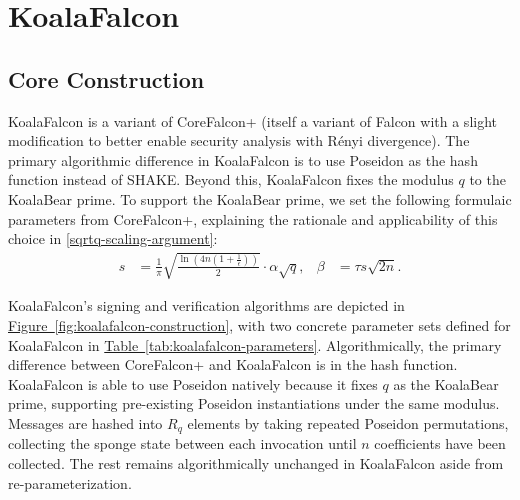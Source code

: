 \section{KoalaFalcon}

\subsection{Core Construction} 

KoalaFalcon is a variant of CoreFalcon+ (itself a variant of Falcon 
with a slight modification to better enable security analysis with Rényi divergence). 
The primary algorithmic difference in KoalaFalcon is to use Poseidon as the hash function 
instead of SHAKE. Beyond this, KoalaFalcon fixes the modulus $q$ to the KoalaBear prime. 
To support the KoalaBear prime, we set the following formulaic parameters from CoreFalcon+, 
explaining the rationale and applicability of this choice in \hyperref[sqrtq-scaling-argument]{\ref*{sqrtq-scaling-argument}}:
\begin{align*}
s &= \frac{1}{\pi} \sqrt{\frac{\ln\!\left(4n\left(1+\frac{1}{\epsilon}\right)\right)}{2}} \cdot \alpha \sqrt{q}, &
\beta &= \tau s \sqrt{2n}.
\end{align*}


KoalaFalcon's signing and verification algorithms are depicted in
\hyperref[fig:koalafalcon-construction]{Figure~\ref*{fig:koalafalcon-construction}}, 
with two concrete parameter sets defined for KoalaFalcon in 
\hyperref[tab:koalafalcon-parameters]{Table~\ref*{tab:koalafalcon-parameters}}.
Algorithmically, the primary difference between CoreFalcon+ and KoalaFalcon is 
in the hash function. KoalaFalcon is able to use Poseidon natively because it 
fixes $q$ as the KoalaBear prime, supporting pre-existing Poseidon instantiations 
under the same modulus. Messages are hashed into $R_q$ elements by taking repeated Poseidon 
permutations, collecting the sponge state between each invocation until $n$ 
coefficients have been collected. The rest remains algorithmically unchanged in 
KoalaFalcon aside from re-parameterization.

